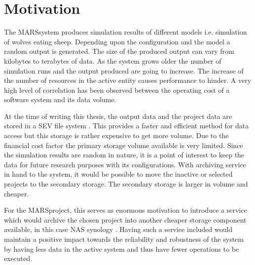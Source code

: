     \section{Motivation}
    
        The MARS\footnotemark[\value{footnote}] system produces simulation results of 
        different models i.e. simulation of wolves eating sheep. Depending upon the 
        configuration and the model a random output is generated. The size of the produced
        output can vary from kilobytes to terabytes of data. As the system grows older the 
        number of simulation runs and the output produced are going to increase. The increase
        of the number of resources in the active entity causes performance to hinder. 
        A very high level of correlation has been observed between the operating cost of a software 
        system and its data volume. 
        
   
        \par

        At the time of writing this thesis, the output data and the project data are stored in a
        SEV file system \cite{SEV}. This provides a faster and efficient method for data
        access but this storage is rather expensive to get more volume. Due to the financial cost 
        factor the primary storage volume available is very limited. Since the simulation 
        results are random in nature, it is a point of interest to keep the data for future
        research purposes with its configurations. With archiving service in hand to the system, 
        it would be possible to move the inactive or selected projects to the secondary storage. 
        The secondary storage is larger in volume and cheaper. 
        
        \par

        For the MARS\footnotemark[\value{footnote}] project, this serves as enormous
        motivation to introduce a service which would archive the chosen project
        into another cheaper storage component available, in this case NAS synology 
        \cite{Synology}. Having such a service included would maintain a positive impact 
        towards the reliability and robustness of the system by having less data in the 
        active system and thus have fewer operations to be executed.
        



